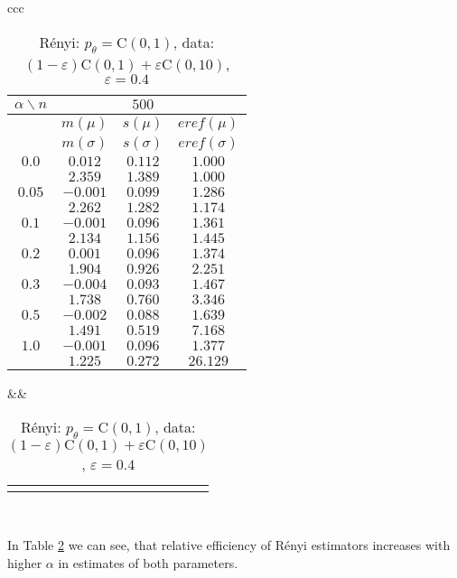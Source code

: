 {\begin{table}[htb] \footnotesize
\begin{center}
\begin{tabular}{ccc}
	\begin{tabular}{|c|ccc|}
	\hline
	$\alpha\backslash n$ && $500$ & \\
	\hline
	& $m(\mu)$ & $s(\mu)$ & $eref(\mu)$ \\
	& $m(\sigma)$ & $s(\sigma)$ & $eref(\sigma)$ \\
	\hline
	$0.0$ & $ 0.012 $ & $ 0.112 $ & $ 1.000 $\\
	 & $ 2.359 $ & $ 1.389 $ & $ 1.000 $\\
	\hline
	$0.05$ & $ -0.001 $ & $ 0.099 $ & $ 1.286 $\\
	 & $ 2.262 $ & $ 1.282 $ & $ 1.174 $\\
	\hline
	$0.1$ & $ -0.001 $ & $ 0.096 $ & $ 1.361 $\\
	 & $ 2.134 $ & $ 1.156 $ & $ 1.445 $\\
	\hline
	$0.2$ & $ 0.001 $ & $ 0.096 $ & $ 1.374 $\\
	 & $ 1.904 $ & $ 0.926 $ & $ 2.251 $\\
	\hline
	$0.3$ & $ -0.004 $ & $ 0.093 $ & $ 1.467 $\\
	 & $ 1.738 $ & $ 0.760 $ & $ 3.346 $\\
	\hline
	$0.5$ & $ -0.002 $ & $ 0.088 $ & $ 1.639 $\\
	 & $ 1.491 $ & $ 0.519 $ & $ 7.168 $\\
	\hline
	$1.0$ & $ -0.001 $ & $ 0.096 $ & $ 1.377 $\\
	 & $ 1.225 $ & $ 0.272 $ & $ 26.129 $\\
	\hline
	\end{tabular}
&&
	\begin{tabular}{c}
		\epsfig{file=Cauchy-e04-eref.eps, height=2.5in}
	\end{tabular}
\\
\end{tabular}
\end{center}
\caption{R\'{e}nyi: $p_\theta = \mathrm{C}(0,1)$, data: $(1-\varepsilon)\mathrm{C}(0,1) + \varepsilon \mathrm{C}(0,10)$, $\varepsilon =  0.4$}
\label{tabJK:cauchy-eref}
\end{table}

\noindent In Table \ref{tabJK:cauchy-eref} we can see, that relative efficiency of R\'{e}nyi estimators increases with higher $\alpha$ in estimates of both parameters.



}

